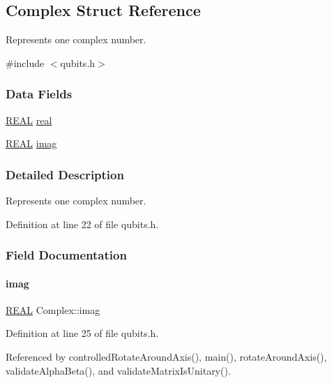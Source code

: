 \hypertarget{structComplex}{}\subsection{Complex Struct Reference}
\label{structComplex}


Represents one complex number.  




{\ttfamily \#include $<$qubits.\+h$>$}

\subsubsection*{Data Fields}
\begin{DoxyCompactItemize}
\item 
\mbox{\hyperlink{precision_8h_a4b654506f18b8bfd61ad2a29a7e38c25}{R\+E\+AL}} \mbox{\hyperlink{structComplex_a479ad939835457595fcca3ca55c06283}{real}}
\item 
\mbox{\hyperlink{precision_8h_a4b654506f18b8bfd61ad2a29a7e38c25}{R\+E\+AL}} \mbox{\hyperlink{structComplex_a1151948284b21c0052f203f23ab931d9}{imag}}
\end{DoxyCompactItemize}


\subsubsection{Detailed Description}
Represents one complex number. 

Definition at line 22 of file qubits.\+h.



\subsubsection{Field Documentation}
\mbox{\label{structComplex_a1151948284b21c0052f203f23ab931d9}} 
\paragraph{\texorpdfstring{imag}{imag}}
{\footnotesize\ttfamily \mbox{\hyperlink{precision_8h_a4b654506f18b8bfd61ad2a29a7e38c25}{R\+E\+AL}} Complex\+::imag}



Definition at line 25 of file qubits.\+h.



Referenced by controlled\+Rotate\+Around\+Axis(), main(), rotate\+Around\+Axis(), validate\+Alpha\+Beta(), and validate\+Matrix\+Is\+Unitary().

